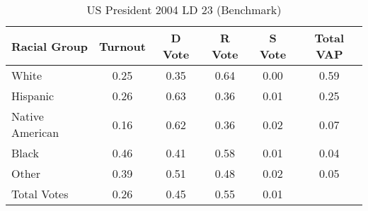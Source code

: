 \begin{table}[htb]
\begin{center}
\caption{US President 2004 LD 23 (Benchmark)}
\label{pres04_vap_ld_23_benchmark}
\begin{tabular}{lccccc}
  \hline
Racial Group & Turnout & D Vote & R Vote & S Vote & Total VAP \\ 
  \hline
White & 0.25 & 0.35 & 0.64 & 0.00 & 0.59 \\ 
  Hispanic & 0.26 & 0.63 & 0.36 & 0.01 & 0.25 \\ 
  Native American & 0.16 & 0.62 & 0.36 & 0.02 & 0.07 \\ 
  Black & 0.46 & 0.41 & 0.58 & 0.01 & 0.04 \\ 
  Other & 0.39 & 0.51 & 0.48 & 0.02 & 0.05 \\ 
  Total Votes & 0.26 & 0.45 & 0.55 & 0.01 &  \\ 
   \hline
\end{tabular}
\end{center}
\end{table}
